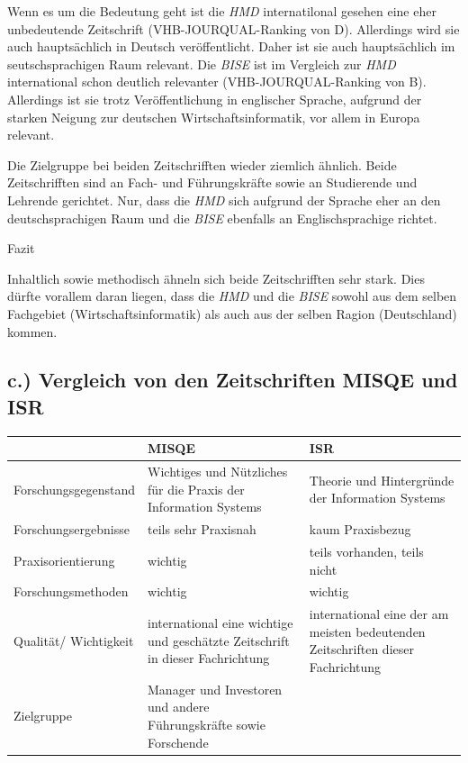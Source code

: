 \documentclass[12pt,utf8]{scrartcl}
\begin{document}
\begin{flushleft}
Wenn es um die Bedeutung geht ist die \emph{HMD} internatilonal gesehen eine eher unbedeutende Zeitschrift (VHB-JOURQUAL-Ranking von D)\cite{VHBJ}. Allerdings wird sie auch hauptsächlich in Deutsch veröffentlicht. Daher ist sie auch hauptsächlich im seutschsprachigen Raum relevant. 
Die \emph{BISE} ist im Vergleich zur \emph{HMD} international schon deutlich relevanter (VHB-JOURQUAL-Ranking von B)\cite{VHBJ}. Allerdings ist sie trotz Veröffentlichung in englischer Sprache, aufgrund der starken Neigung zur deutschen Wirtschaftsinformatik, vor allem in Europa relevant. 

Die Zielgruppe bei beiden Zeitschrifften wieder ziemlich ähnlich. Beide Zeitschrifften sind an Fach- und Führungskräfte sowie an Studierende und Lehrende gerichtet. Nur, dass die \emph{HMD} sich aufgrund der Sprache eher an den deutschsprachigen Raum und die \emph{BISE} ebenfalls an Englischsprachige richtet.
\newline

{\Large Fazit}

Inhaltlich sowie methodisch ähneln sich beide Zeitschrifften sehr stark. Dies dürfte vorallem daran liegen, dass die \emph{HMD} und die \emph{BISE} sowohl aus dem selben Fachgebiet (Wirtschaftsinformatik) als auch aus der selben Ragion (Deutschland) kommen.
\subsection{\label{sub3:einfuehrung}c.) Vergleich von den Zeitschriften MISQE und ISR}

\begin{tabular}{|p{4cm}|p{5.5cm}|p{5.5cm}|}
\hline
& MISQE & ISR \\
\hline
Forschungsgegenstand & Wichtiges und Nützliches für die Praxis der Information Systems & Theorie und Hintergründe der Information Systems \\
\hline
Forschungsergebnisse & teils sehr Praxisnah & kaum Praxisbezug \\
\hline
Praxisorientierung & wichtig & teils vorhanden, teils nicht \\
\hline
Forschungsmethoden & wichtig & wichtig \\
\hline
Qualität/ Wichtigkeit & international eine wichtige und geschätzte Zeitschrift in dieser Fachrichtung & international eine der am meisten bedeutenden Zeitschriften dieser Fachrichtung \\
\hline
Zielgruppe & Manager und Investoren und andere Führungskräfte sowie Forschende &  \\
\hline
\end{tabular}
\newline
\newline
\newline


\end{flushleft}
\end{document}
